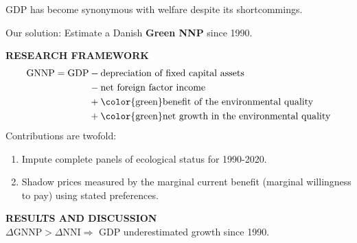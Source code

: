 \begin{frame}
  GDP has become synonymous with welfare despite its shortcommings.\par
  Our solution: Estimate a Danish \textbf{Green NNP} since 1990.
  \begin{tcolorbox}
    \textbf{RESEARCH FRAMEWORK}
    \begin{align*}
        \text{GNNP} = \text{GDP} &- \text{depreciation of fixed capital assets} \\
        &- \text{net foreign factor income} \\
        &+ \text{\color{green}benefit of the environmental quality} \\
        &+ \text{\color{green}net growth in the environmental quality}
    \end{align*}
    Contributions are twofold:
    \begin{enumerate}
      \item Impute complete panels of ecological status for 1990-2020.
      \item Shadow prices measured by the marginal current benefit (marginal willingness to pay) using stated preferences.
    \end{enumerate}
  \end{tcolorbox}
  \textbf{RESULTS AND DISCUSSION}\\
  $\Delta\text{GNNP}>\Delta\text{NNI}\Rightarrow$ GDP underestimated growth since 1990.
\end{frame}